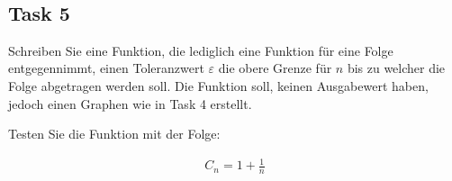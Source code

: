 \documentclass[11pt]{article}
\begin{document}
    \begin{center}
    \end{center}
    { \hspace*{\fill} \\}
    
    \subsection{Task 5}\label{task-5}

Schreiben Sie eine Funktion, die lediglich eine Funktion für eine Folge
entgegennimmt, einen Toleranzwert \(\varepsilon\) die obere Grenze für
\(n\) bis zu welcher die Folge abgetragen werden soll. Die Funktion
soll, keinen Ausgabewert haben, jedoch einen Graphen wie in Task 4
erstellt.

Testen Sie die Funktion mit der Folge:

\begin{align*}
C_n = 1+\frac{1}{n}
\end{align*}
\end{document}
